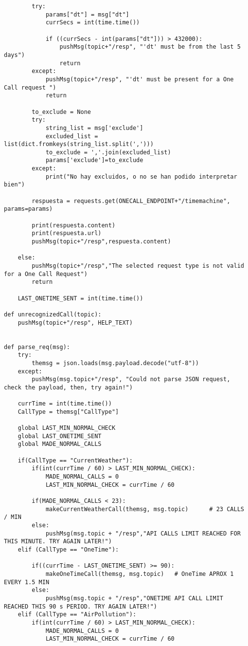 \documentclass{scrbook}
\begin{document}
{\begin{verbatim}
        try:
            params["dt"] = msg["dt"]
            currSecs = int(time.time())

            if ((currSecs - int(params["dt"])) > 432000):
                pushMsg(topic+"/resp", "'dt' must be from the last 5 days")
                return
        except:
            pushMsg(topic+"/resp", "'dt' must be present for a One Call request ")
            return

        to_exclude = None
        try:
            string_list = msg['exclude']
            excluded_list = list(dict.fromkeys(string_list.split(',')))
            to_exclude = ','.join(excluded_list)
            params['exclude']=to_exclude
        except:
            print("No hay excluidos, o no se han podido interpretar bien")

        respuesta = requests.get(ONECALL_ENDPOINT+"/timemachine", params=params)

        print(respuesta.content)
        print(respuesta.url)
        pushMsg(topic+"/resp",respuesta.content)

    else:
        pushMsg(topic+"/resp","The selected request type is not valid for a One Call Request")
        return
    
    LAST_ONETIME_SENT = int(time.time())

def unrecognizedCall(topic):
    pushMsg(topic+"/resp", HELP_TEXT)


def parse_req(msg):
    try:
        themsg = json.loads(msg.payload.decode("utf-8"))
    except:
        pushMsg(msg.topic+"/resp", "Could not parse JSON request, check the payload, then, try again!")

    currTime = int(time.time())
    CallType = themsg["CallType"]

    global LAST_MIN_NORMAL_CHECK
    global LAST_ONETIME_SENT
    global MADE_NORMAL_CALLS

    if(CallType == "CurrentWeather"):        
        if(int(currTime / 60) > LAST_MIN_NORMAL_CHECK):
            MADE_NORMAL_CALLS = 0
            LAST_MIN_NORMAL_CHECK = currTime / 60

        if(MADE_NORMAL_CALLS < 23):
            makeCurrentWeatherCall(themsg, msg.topic)      # 23 CALLS / MIN
        else:
            pushMsg(msg.topic + "/resp","API CALLS LIMIT REACHED FOR THIS MINUTE. TRY AGAIN LATER!")
    elif (CallType == "OneTime"):

        if((currTime - LAST_ONETIME_SENT) >= 90):
            makeOneTimeCall(themsg, msg.topic)   # OneTime APROX 1 EVERY 1.5 MIN
        else:
            pushMsg(msg.topic + "/resp","ONETIME API CALL LIMIT REACHED THIS 90 s PERIOD. TRY AGAIN LATER!")
    elif (CallType == "AirPollution"):
        if(int(currTime / 60) > LAST_MIN_NORMAL_CHECK):
            MADE_NORMAL_CALLS = 0
            LAST_MIN_NORMAL_CHECK = currTime / 60


\end{verbatim}}
\end{document}
